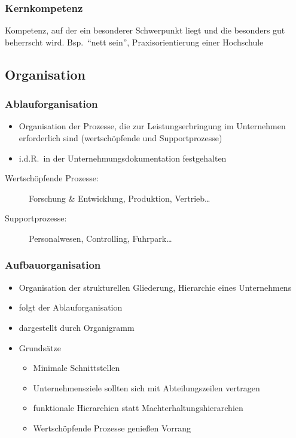 \documentclass[a4paper, 12pt]{article}
\begin{document}
\subsubsection{Kernkompetenz}
Kompetenz, auf der ein besonderer Schwerpunkt liegt und die besonders gut beherrscht wird. Bsp.\ ``nett sein'', Praxisorientierung einer Hochschule


\subsection{Organisation}

\subsubsection{Ablauforganisation}
\begin{itemize}
  \item Organisation der Prozesse, die zur Leistungserbringung im Unternehmen erforderlich sind (wertschöpfende und Supportprozesse)
  \item i.d.R.\ in der Unternehmungsdokumentation festgehalten
\end{itemize}
\begin{description}
  \item[Wertschöpfende Prozesse:] Forschung \& Entwicklung, Produktion, Vertrieb\ldots
  \item[Supportprozesse:] Personalwesen, Controlling, Fuhrpark\ldots
\end{description}

\subsubsection{Aufbauorganisation}
\begin{itemize}
  \item Organisation der strukturellen Gliederung, Hierarchie eines Unternehmens
  \item folgt der Ablauforganisation
  \item dargestellt durch Organigramm
  \item Grundsätze
    \begin{itemize}
      \item Minimale Schnittstellen
      \item Unternehmensziele sollten sich mit Abteilungszeilen vertragen
      \item funktionale Hierarchien statt Machterhaltungshierarchien
      \item Wertschöpfende Prozesse genießen Vorrang
    \end{itemize}
\end{itemize}
\end{document}
